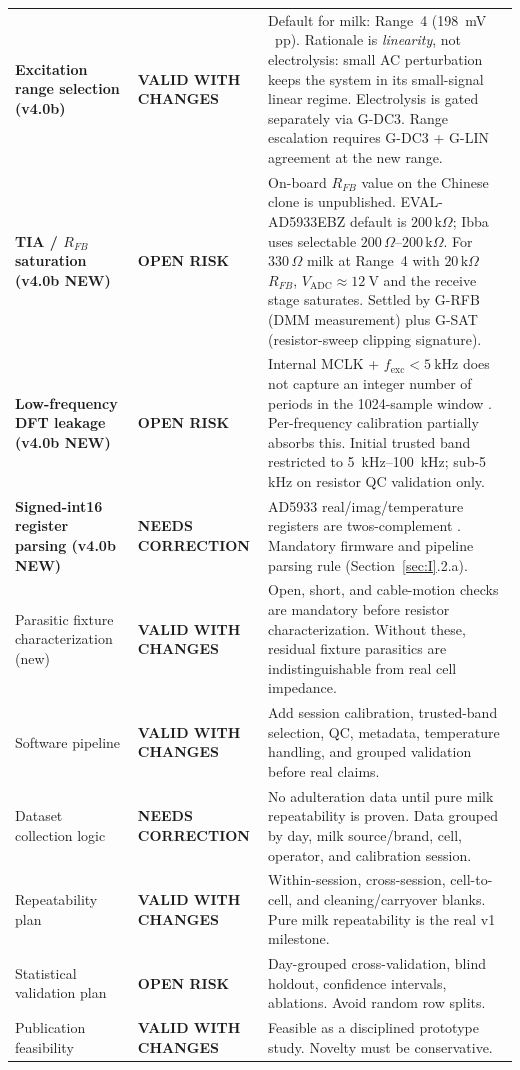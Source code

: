 \documentclass[11pt,a4paper]{article}
\newcommand{\kohm}[1]{\ensuremath{#1\,\mathrm{k}\Omega}}
\newcommand{\Rohm}[1]{\ensuremath{#1\,\Omega}}
\newcommand{\VALIDCHANGES}{\textcolor{EISTeal}{\textbf{VALID WITH CHANGES}}}
\newcommand{\CORRECTION}{\textcolor{EISAmber}{\textbf{NEEDS CORRECTION}}}
\newcommand{\OPENRISK}{\textcolor{EISRed}{\textbf{OPEN RISK}}}
\begin{document}
\begin{xltabular}{\textwidth}{L{38mm}L{32mm}Y}
\textbf{Excitation range selection (v4.0b)} & \VALIDCHANGES & Default for milk: Range~4 (\SI{198}{\milli\volt\,pp}). Rationale is \emph{linearity}, not electrolysis: small AC perturbation keeps the system in its small-signal linear regime. Electrolysis is gated separately via G-DC3. Range escalation requires G-DC3 + G-LIN agreement at the new range.\\
\textbf{TIA / $R_{FB}$ saturation (v4.0b NEW)} & \OPENRISK & On-board $R_{FB}$ value on the Chinese clone is unpublished. EVAL-AD5933EBZ default is \kohm{200}; Ibba uses selectable \Rohm{200}--\kohm{200}. For \Rohm{330} milk at Range~4 with \kohm{20} $R_{FB}$, $V_\mathrm{ADC}\approx\SI{12}{\volt}$ and the receive stage saturates. Settled by G-RFB (DMM measurement) plus G-SAT (resistor-sweep clipping signature).\\
\textbf{Low-frequency DFT leakage (v4.0b NEW)} & \OPENRISK & Internal MCLK + $f_\mathrm{exc}<\SI{5}{\kilo\hertz}$ does not capture an integer number of periods in the 1024-sample window \cite{ug364}. Per-frequency calibration partially absorbs this. Initial trusted band restricted to \SIrange{5}{100}{\kilo\hertz}; sub-5\,kHz on resistor QC validation only.\\
\textbf{Signed-int16 register parsing (v4.0b NEW)} & \CORRECTION & AD5933 real/imag/temperature registers are twos-complement \cite{ad5933ds}. Mandatory firmware and pipeline parsing rule (Section~\ref{sec:I}.2.a).\\
Parasitic fixture characterization (new) & \VALIDCHANGES & Open, short, and cable-motion checks are mandatory before resistor characterization. Without these, residual fixture parasitics are indistinguishable from real cell impedance.\\
Software pipeline & \VALIDCHANGES & Add session calibration, trusted-band selection, QC, metadata, temperature handling, and grouped validation before real claims.\\
Dataset collection logic & \CORRECTION & No adulteration data until pure milk repeatability is proven. Data grouped by day, milk source/brand, cell, operator, and calibration session.\\
Repeatability plan & \VALIDCHANGES & Within-session, cross-session, cell-to-cell, and cleaning/carryover blanks. Pure milk repeatability is the real v1 milestone.\\
Statistical validation plan & \OPENRISK & Day-grouped cross-validation, blind holdout, confidence intervals, ablations. Avoid random row splits.\\
Publication feasibility & \VALIDCHANGES & Feasible as a disciplined prototype study. Novelty must be conservative.\\
\bottomrule
\end{xltabular}
\normalsize
\end{document}
